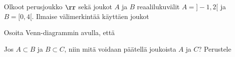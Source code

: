 \begin{kotitehtavasivu}
\begin{tehtava}
\begin{vastaus}
        \begin{alakohdat}
        \alakohta{-} %
        \end{alakohdat}
    \end{vastaus}
\end{tehtava}

\begin{tehtava}
Olkoot perusjoukko $\rr$ sekä joukot $A$ ja $B$ reaalilukuvälit $A=]-1, 2[$ ja $B=[0, 4[$. Ilmaise välimerkintää käyttäen joukot
    \begin{alakohdat}
    \end{alakohdat}

    \begin{vastaus}
    
        \begin{alakohdat}
        \alakohta{}
        \alakohta{}
        \alakohta{}
        \alakohta{}
        \alakohta{}
        \alakohta{} 
        \end{alakohdat}
    \end{vastaus}
\end{tehtava}


\begin{tehtava}
Osoita Venn-diagrammin avulla, että
    \begin{alakohdat}
        \alakohta{\[
X\setminus (A\cup B) = (X\setminus A)\cap (X\setminus B),
\]}
        \alakohta{\[
X \setminus (A\cap B) = (X\setminus A)\cup (X\setminus B).
\]}
      
    \end{alakohdat}

    \begin{vastaus}
    
        \begin{alakohdat}
        \alakohta{}
        \alakohta{}
        \end{alakohdat}
    \end{vastaus}
\end{tehtava}


\begin{tehtava}
Jos $A\subset B$ ja $B\subset C$, niin mitä voidaan päätellä joukoista $A$ ja $C$? Perustele 
    \begin{alakohdat}
    \end{alakohdat}


\end{tehtava}
\end{kotitehtavasivu}
